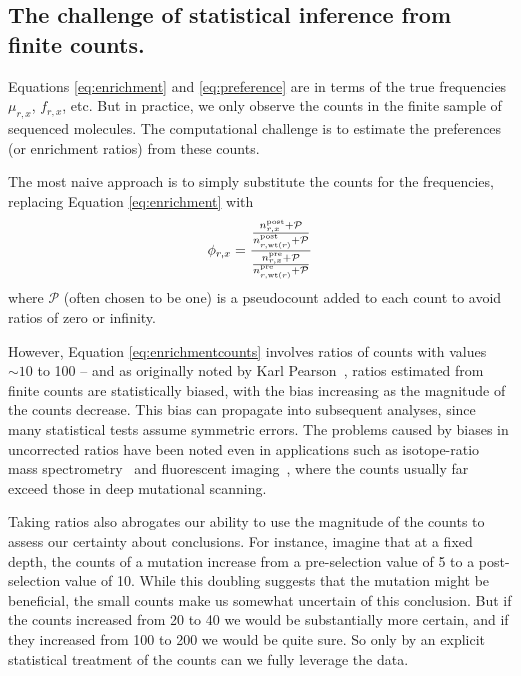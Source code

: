 \documentclass[twocolumn]{bmcart}%
\begin{document}
\subsection*{The challenge of statistical inference from finite counts.}
Equations \ref{eq:enrichment} and \ref{eq:preference} are in terms of the true frequencies $\mu_{r,x}$, $f_{r,x}$, etc. But in practice, we only observe the counts in the finite sample of sequenced molecules. The computational challenge is to estimate the preferences (or enrichment ratios) from these counts.

The most naive approach is to simply substitute the counts for the frequencies, replacing Equation \ref{eq:enrichment} with
\begin{equation}
\label{eq:enrichmentcounts}
\phi_{r,x} = \frac{\frac{n_{r,x}^{\rm{post}} + \mathcal{P}}{n_{r,\operatorname{wt}\left(r\right)}^{\rm{post}} + \mathcal{P}}}{\frac{n_{r,x}^{\rm{pre}} + \mathcal{P}}{n_{r,\operatorname{wt}\left(r\right)}^{\rm{pre}} + \mathcal{P}}}
\end{equation}
where $\mathcal{P}$ (often chosen to be one) is a pseudocount added to each count to avoid ratios of zero or infinity.

However, Equation \ref{eq:enrichmentcounts} involves ratios of counts with values $\sim 10$ to 100 -- and as originally noted by Karl Pearson~\cite{pearson1896mathematical,pearson1910}, ratios estimated from finite counts are statistically biased, with the bias increasing as the magnitude of the counts decrease. This bias can propagate into subsequent analyses, since many statistical tests assume symmetric errors. The problems caused by biases in uncorrected ratios have been noted even in applications such as isotope-ratio mass spectrometry~\cite{ogliore2011} and fluorescent imaging~\cite{van2000mean}, where the counts usually far exceed those in deep mutational scanning.

Taking ratios also abrogates our ability to use the magnitude of the counts to assess our certainty about conclusions. For instance, imagine that at a fixed depth, the counts of a mutation increase from a pre-selection value of 5 to a post-selection value of 10. While this doubling suggests that the mutation might be beneficial, the small counts make us somewhat uncertain of this conclusion. But if the counts increased from 20 to 40 we would be substantially more certain, and if they increased from 100 to 200 we would be quite sure. So only by an explicit statistical treatment of the counts can we fully leverage the data.
\end{document}
